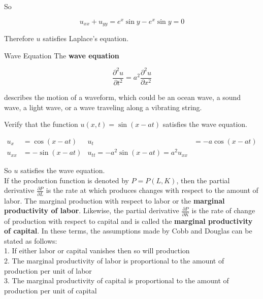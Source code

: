         So

        \[
            u_{xx} + u_{yy} = e^x \sin{y} - e^x \sin{y} = 0
        \]

        Therefore $u$ satisfies Laplace's equation. \\

        \begin{axiom}{Wave Equation}
            The \textbf{wave equation}

            \[
                \frac{\partial^2 u}{\partial t^2} = a^2 \frac{\partial^2 u}{\partial x^2}
            \]

            describes the motion of a waveform, which could be an ocean wave, a sound wave, a light wave, or a wave traveling along a vibrating string.
        \end{axiom}

        \textit{} Verify that the function $u(x,t) = \sin{(x-at)}$ satisfies the wave equation.

        \begin{align*}
            u_x &= \cos{(x-at)} & u_t &= -a\cos{(x-at)} \\
            u_{xx}  &= -\sin{(x-at)} & u_{tt} = -a^2 \sin{(x-at)} = a^2 u_{xx}
        \end{align*}

        So $u$ satisfies the wave equation. \\

        If the production function is denoted by $P=P(L,K)$, then the partial derivative $\frac{\partial P}{\partial L}$ is the rate at which produces changes with respect to the amount of labor. The marginal production
        with respect to labor or the \textbf{marginal productivity of labor}. Likewise, the partial derivative $\frac{\partial P}{\partial K}$ is the rate of change of production with respect to capital and is called the
        \textbf{marginal productivity of capital}. In these terms, the assumptions made by Cobb and Douglas can be stated as follows: \\

        1. If either labor or capital vanishes then so will production \\
        2. The marginal productivity of labor is proportional to the amount of production per unit of labor \\
        3. The marginal productivity of capital is proportional to the amount of production per unit of capital \\

